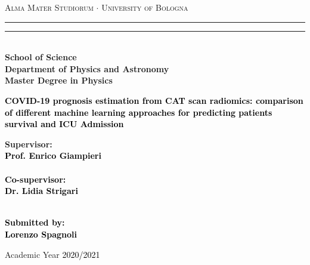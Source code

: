 \documentclass[12pt,a4paper]{report}
\theoremstyle{definition}
\theoremstyle{remark}
\begin{document}
\begin{titlepage}
\begin{center}
{{\Large{\textsc{Alma Mater Studiorum $\cdot$ University of  Bologna}}}} 
\rule[0.1cm]{15.8cm}{0.1mm}
\rule[0.5cm]{15.8cm}{0.6mm}
\\\vspace{3mm}
{\small{\bf School of Science \\
Department of Physics and Astronomy\\
Master Degree in Physics}}
\end{center}

\vspace{23mm}

\begin{center}\textcolor{black}{
{\LARGE{\bf COVID-19 prognosis estimation from CAT scan radiomics: comparison of different machine learning approaches for predicting patients survival and ICU Admission}}\\
}\end{center}

\vspace{50mm} \par \noindent

\begin{minipage}[t]{0.47\textwidth}
{\large{\bf Supervisor: \vspace{2mm}\\\textcolor{black}{
Prof. Enrico Giampieri}\\\\
\textcolor{black}{
\bf Co-supervisor:\vspace{2mm}\\
Dr. Lidia Strigari\\\\}}}
\end{minipage}
%
\hfill
%
\begin{minipage}[t]{0.47\textwidth}\raggedleft \textcolor{black}{
{\large{\bf Submitted by:
\vspace{2mm}\\
%
%
\textcolor{black}{
Lorenzo Spagnoli}}}
}
\end{minipage}

\vspace{40mm}

\begin{center}
%
%
Academic Year \textcolor{black}{2020/2021}
\end{center}

\end{titlepage}
\end{document}
